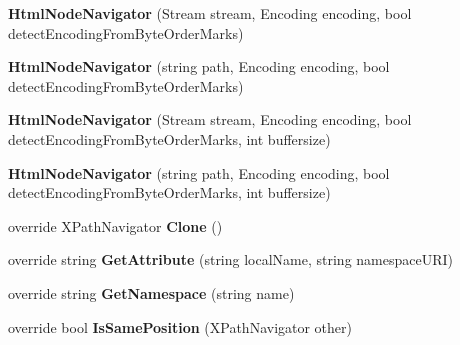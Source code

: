\begin{DoxyCompactItemize}
{\bfseries Html\+Node\+Navigator} (Stream stream, Encoding encoding, bool detect\+Encoding\+From\+Byte\+Order\+Marks)
\item 
\mbox{\label{class_html_agility_pack_1_1_html_node_navigator_a2852fd306ba9ce0fb8f2ce9684501a16}} 
{\bfseries Html\+Node\+Navigator} (string path, Encoding encoding, bool detect\+Encoding\+From\+Byte\+Order\+Marks)
\item 
\mbox{\label{class_html_agility_pack_1_1_html_node_navigator_a5cb6a280b7e667e66b65ce6095623c44}} 
{\bfseries Html\+Node\+Navigator} (Stream stream, Encoding encoding, bool detect\+Encoding\+From\+Byte\+Order\+Marks, int buffersize)
\item 
\mbox{\label{class_html_agility_pack_1_1_html_node_navigator_adece1b769414ac23cfdc5e3055df53ce}} 
{\bfseries Html\+Node\+Navigator} (string path, Encoding encoding, bool detect\+Encoding\+From\+Byte\+Order\+Marks, int buffersize)
\item 
\mbox{\label{class_html_agility_pack_1_1_html_node_navigator_af3ce86e553376b49e5756788e2c75257}} 
override X\+Path\+Navigator {\bfseries Clone} ()
\item 
\mbox{\label{class_html_agility_pack_1_1_html_node_navigator_acce3f25620b1d302a215fc14102606a4}} 
override string {\bfseries Get\+Attribute} (string local\+Name, string namespace\+U\+RI)
\item 
\mbox{\label{class_html_agility_pack_1_1_html_node_navigator_a2e194b0010b262a2de87f09c9fa78a80}} 
override string {\bfseries Get\+Namespace} (string name)
\item 
\mbox{\label{class_html_agility_pack_1_1_html_node_navigator_af9f7339da8b725e833ef10c9a5668839}} 
override bool {\bfseries Is\+Same\+Position} (X\+Path\+Navigator other)
\item 
\mbox{\label{class_html_agility_pack_1_1_html_node_navigator_ac390a43d465998e92f487003df471541}} 

\end{DoxyCompactItemize}
